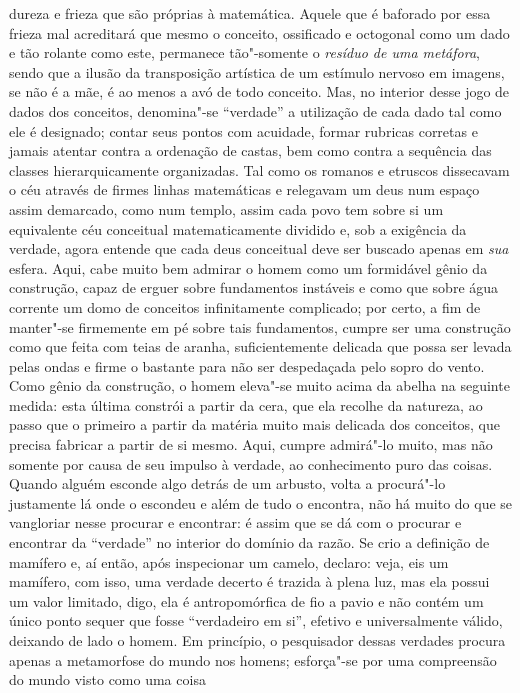 dureza e frieza que são próprias à matemática. Aquele que é baforado
por essa frieza mal acreditará que mesmo o conceito, ossificado e
octogonal como um dado e tão rolante como este, permanece tão"-somente
o \textit{resíduo de uma metáfora}, sendo que a ilusão da transposição
artística de um estímulo nervoso em imagens, se não é a mãe, é ao menos
a avó de todo conceito. Mas, no interior desse jogo de dados dos
conceitos, denomina"-se “verdade” a utilização de cada dado tal como
ele é designado; contar seus pontos com acuidade, formar rubricas
corretas e jamais atentar contra a ordenação de castas, bem como contra
a sequência das classes hierarquicamente organizadas. Tal como os
romanos e etruscos dissecavam o céu através de firmes linhas
matemáticas e relegavam um deus num espaço assim demarcado, como num
templo, assim cada povo tem sobre si um equivalente céu conceitual
matematicamente dividido e, sob a exigência da verdade, agora entende
que cada deus conceitual deve ser buscado apenas em \textit{sua} esfera.
Aqui, cabe muito bem admirar o homem como um formidável gênio da
construção, capaz de erguer sobre fundamentos instáveis e como que
sobre água corrente um domo de conceitos infinitamente complicado; por
certo, a fim de manter"-se firmemente em pé sobre tais fundamentos,
cumpre ser uma construção como que feita com teias de aranha,
suficientemente delicada que possa ser levada pelas ondas e firme o
bastante para não ser despedaçada pelo sopro do vento. Como gênio da
construção, o homem eleva"-se muito acima da abelha na seguinte
medida: esta última constrói a partir da cera, que ela recolhe da
natureza, ao passo que o primeiro a partir da matéria muito mais
delicada dos conceitos, que precisa fabricar a partir de si mesmo. Aqui,
cumpre admirá"-lo muito, mas não somente por causa de seu impulso à
verdade, ao conhecimento puro das coisas. Quando alguém esconde algo
detrás de um arbusto, volta a procurá"-lo justamente lá onde o
escondeu e além de tudo o encontra, não há muito do que se vangloriar
nesse procurar e encontrar: é assim que se dá com o procurar e
encontrar da “verdade” no interior do domínio da razão. Se crio a
definição de mamífero e, aí então, após inspecionar um camelo, declaro:
veja, eis um mamífero, com isso, uma verdade decerto é trazida à plena
luz, mas ela possui um valor limitado, digo, ela é antropomórfica de
fio a pavio e não contém um único ponto sequer que fosse “verdadeiro em
si”, efetivo e universalmente válido, deixando de lado o homem. Em princípio, 
o pesquisador dessas verdades procura apenas a metamorfose do
mundo nos homens; esforça"-se por uma compreensão do mundo visto como uma coisa
